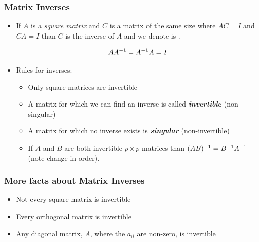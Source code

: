 \documentclass{beamer}
\begin{document}
\begin{frame}
  \frametitle{Matrix Inverses}

\begin{itemize}
\item If $A$ is a \emph{square matrix} and $C$ is a matrix of the same size where $AC = I$ and $CA=I$ than $C$ is the inverse of $A$ and we denote is .

\[
AA^{-1} = A^{-1}A = I
\]


\item Rules for inverses:

\begin{itemize}
 \item Only square matrices are invertible
 \item A matrix for which we can find an inverse is called \emph{\textbf{invertible}} (non-singular)
 \item A matrix for which no inverse exists is \emph{\textbf{singular}} (non-invertible)
 \item If $A$ and $B$ are both invertible $p \times p$ matrices than $(AB)^{-1} = B^{-1} A^{-1}$ (note change in order).
\end{itemize}
 
\end{itemize}


\end{frame}

\begin{frame}
  \frametitle{More facts about Matrix Inverses}

 \begin{itemize}
 \item Not every square matrix is invertible
 \item Every orthogonal matrix is invertible
 \item Any diagonal matrix, $A$, where the $a_{ii}$ are non-zero, is invertible
 \end{itemize}
 
\end{frame} 

\end{document}
